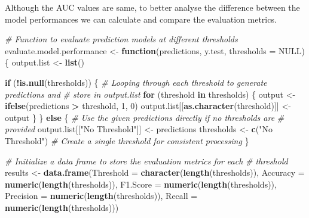\documentclass[
  10pt,
  paper=a4,
  ,captions=tableheading
]{scrartcl}
\newenvironment{Shaded}{\begin{snugshade}}{\end{snugshade}}
\newcommand{\AttributeTok}[1]{\textcolor[rgb]{0.13,0.29,0.53}{#1}}
\newcommand{\CommentTok}[1]{\textcolor[rgb]{0.56,0.35,0.01}{\textit{#1}}}
\newcommand{\ConstantTok}[1]{\textcolor[rgb]{0.56,0.35,0.01}{#1}}
\newcommand{\ControlFlowTok}[1]{\textcolor[rgb]{0.13,0.29,0.53}{\textbf{#1}}}
\newcommand{\DecValTok}[1]{\textcolor[rgb]{0.00,0.00,0.81}{#1}}
\newcommand{\FunctionTok}[1]{\textcolor[rgb]{0.13,0.29,0.53}{\textbf{#1}}}
\newcommand{\NormalTok}[1]{#1}
\newcommand{\OtherTok}[1]{\textcolor[rgb]{0.56,0.35,0.01}{#1}}
\newcommand{\SpecialCharTok}[1]{\textcolor[rgb]{0.81,0.36,0.00}{\textbf{#1}}}
\newcommand{\StringTok}[1]{\textcolor[rgb]{0.31,0.60,0.02}{#1}}
\begin{document}
\small

Although the AUC values are same, to better analyse the difference
between the model performances we can calculate and compare the
evaluation metrics.

\small

\begin{Shaded}
\begin{Highlighting}[]
\CommentTok{\# Function to evaluate prediction models at different thresholds}
\NormalTok{evaluate.model.performance }\OtherTok{\textless{}{-}} \ControlFlowTok{function}\NormalTok{(predictions, y.test, }\AttributeTok{thresholds =} \ConstantTok{NULL}\NormalTok{) \{}
\NormalTok{    output.list }\OtherTok{\textless{}{-}} \FunctionTok{list}\NormalTok{()}

    \ControlFlowTok{if}\NormalTok{ (}\SpecialCharTok{!}\FunctionTok{is.null}\NormalTok{(thresholds)) \{}
        \CommentTok{\# Looping through each threshold to generate predictions and}
        \CommentTok{\# store in output.list}
        \ControlFlowTok{for}\NormalTok{ (threshold }\ControlFlowTok{in}\NormalTok{ thresholds) \{}
\NormalTok{            output }\OtherTok{\textless{}{-}} \FunctionTok{ifelse}\NormalTok{(predictions }\SpecialCharTok{\textgreater{}}\NormalTok{ threshold, }\DecValTok{1}\NormalTok{, }\DecValTok{0}\NormalTok{)}
\NormalTok{            output.list[[}\FunctionTok{as.character}\NormalTok{(threshold)]] }\OtherTok{\textless{}{-}}\NormalTok{ output}
\NormalTok{        \}}
\NormalTok{    \} }\ControlFlowTok{else}\NormalTok{ \{}
        \CommentTok{\# Use the given predictions directly if no thresholds are}
        \CommentTok{\# provided}
\NormalTok{        output.list[[}\StringTok{"No Threshold"}\NormalTok{]] }\OtherTok{\textless{}{-}}\NormalTok{ predictions}
\NormalTok{        thresholds }\OtherTok{\textless{}{-}} \FunctionTok{c}\NormalTok{(}\StringTok{"No Threshold"}\NormalTok{)  }\CommentTok{\# Create a single \textquotesingle{}threshold\textquotesingle{} for consistent processing}
\NormalTok{    \}}

    \CommentTok{\# Initialize a data frame to store the evaluation metrics for each}
    \CommentTok{\# threshold}
\NormalTok{    results }\OtherTok{\textless{}{-}} \FunctionTok{data.frame}\NormalTok{(}\AttributeTok{Threshold =} \FunctionTok{character}\NormalTok{(}\FunctionTok{length}\NormalTok{(thresholds)), }\AttributeTok{Accuracy =} \FunctionTok{numeric}\NormalTok{(}\FunctionTok{length}\NormalTok{(thresholds)),}
        \AttributeTok{F1.Score =} \FunctionTok{numeric}\NormalTok{(}\FunctionTok{length}\NormalTok{(thresholds)), }\AttributeTok{Precision =} \FunctionTok{numeric}\NormalTok{(}\FunctionTok{length}\NormalTok{(thresholds)),}
        \AttributeTok{Recall =} \FunctionTok{numeric}\NormalTok{(}\FunctionTok{length}\NormalTok{(thresholds)))}


\end{Highlighting}
\end{Shaded}
\end{document}
